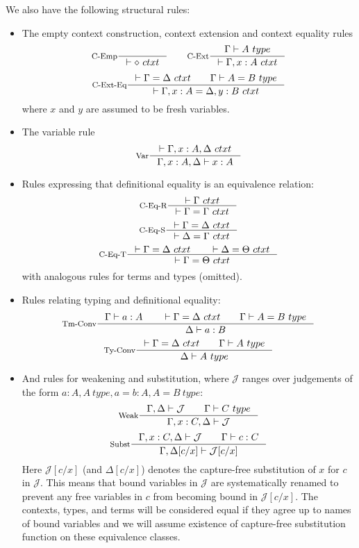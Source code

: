 We also have the following structural rules:
\begin{itemize}
  \item The empty context construction, context extension and context equality
    rules
    \[
      \inference[C-Emp]{}{\vdash \diamond~ctxt}
      \qquad
      \inference[C-Ext]{\Gamma \vdash A~type}{\vdash \Gamma, x : A~ctxt}
    \]
    \[
      \inference[C-Ext-Eq]{\vdash \Gamma = \Delta~ctxt \qquad \Gamma \vdash A = B~type}{\vdash \Gamma, x:A = \Delta, y:B~ctxt}
    \]
    where $x$ and $y$ are assumed to be fresh variables.
  \item The variable rule
    \[
      \inference[Var]{\vdash \Gamma, x:A,\Delta~ctxt}{\Gamma,x:A,\Delta \vdash x:A}
    \]
  \item Rules expressing that definitional equality is an equivalence relation:
    \[
      \inference[C-Eq-R]{\vdash \Gamma~ctxt}{\vdash \Gamma = \Gamma~ctxt}
    \]
    \[
      \inference[C-Eq-S]{\vdash \Gamma = \Delta~ctxt}{\vdash \Delta = \Gamma~ctxt}
    \]
    \[
      \inference[C-Eq-T]{\vdash \Gamma = \Delta~ctxt \qquad \vdash \Delta = \Theta~ctxt}{\vdash \Gamma = \Theta~ctxt}
    \]
    with analogous rules for terms and types (omitted).
  \item Rules relating typing and definitional equality:
    \[
      \inference[Tm-Conv]{\Gamma \vdash a : A \qquad \vdash \Gamma = \Delta~ctxt \qquad \Gamma \vdash A = B~type}{\Delta \vdash a : B}
    \]
    \[
      \inference[Ty-Conv]{\vdash \Gamma = \Delta~ctxt \qquad \Gamma \vdash A~type}{\Delta \vdash A~type}
    \]
  \item And rules for weakening and substitution, where $\mathcal{J}$ ranges over judgements of the form $a : A, A~type, a = b: A, A = B~type$:
    \[
      \inference[Weak]{\Gamma, \Delta \vdash \mathcal{J} \qquad \Gamma \vdash C~type}{\Gamma, x : C, \Delta \vdash \mathcal{J}}
    \]
    \[
      \inference[Subst]{\Gamma, x: C, \Delta \vdash \mathcal{J} \qquad \Gamma \vdash c: C}{\Gamma, \Delta[c/x] \vdash \mathcal{J}[c/x]}
    \]
    Here $\mathcal{J}[c/x]$ (and $\Delta[c/x]$) denotes the capture-free
    substitution of $x$ for $c$ in $\mathcal{J}$. This means that bound
    variables in $\mathcal{J}$ are systematically renamed to prevent any free
    variables in $c$ from becoming bound in $\mathcal{J}[c/x]$. The contexts,
    types, and terms will be considered equal if they agree up to names of
    bound variables and we will assume existence of capture-free substitution
    function on these equivalence classes.
\end{itemize}

